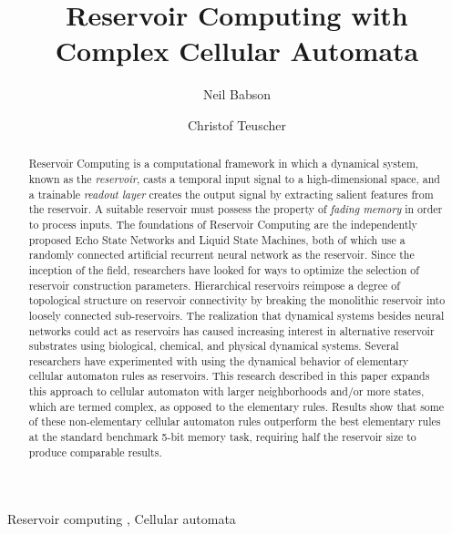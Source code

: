 \documentclass{elsarticle}
\begin{document}
\begin{frontmatter}

\title{Reservoir Computing with Complex Cellular Automata}
\author{Neil Babson} %

\author{Christof Teuscher}
\address{Portland State University, P.O.  Box 751, Portland, OR 97207-0751, 
   USA}
   



\begin{abstract}
Reservoir Computing is a computational framework in which a dynamical system, 
          known as the \textit{reservoir}, casts a temporal input signal to a 
          high-dimensional space, and a trainable \textit{readout layer} 
          creates the output signal by extracting salient features from the 
          reservoir.
A suitable reservoir  must possess the property of 
\textit{fading memory} in order to process inputs. The foundations of Reservoir Computing are the 
independently proposed Echo State Networks and Liquid State Machines, both of 
which use a randomly connected artificial recurrent neural network as the 
reservoir. Since the inception of the field, researchers have looked for ways 
to optimize the selection of reservoir construction parameters. Hierarchical 
reservoirs reimpose a degree of topological structure on reservoir connectivity 
by breaking the monolithic reservoir into loosely connected sub-reservoirs. The 
realization that dynamical systems besides neural networks could act as 
reservoirs has caused increasing interest in alternative reservoir substrates 
using biological, chemical, and physical dynamical systems. Several researchers 
have experimented with using the dynamical behavior of elementary cellular 
automaton rules as reservoirs. This research described in this paper expands 
this approach to cellular automaton with larger neighborhoods and/or more 
states, which are termed complex, as opposed to the elementary rules. Results 
show that some of these non-elementary cellular automaton rules outperform the 
best elementary rules at the standard benchmark 5-bit memory task, requiring 
half the reservoir size to produce comparable results.
\end{abstract}

\begin{keyword}
Reservoir computing \sep
Cellular automata

\end{keyword}

\end{frontmatter}
\end{document}
